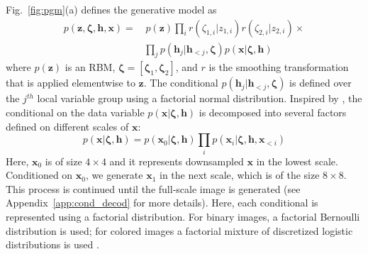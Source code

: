 \documentclass{article}
\newcommand{\x}{{\pmb{x}}}
\newcommand{\z}{{\pmb{z}}}
\newcommand{\h}{{\pmb{h}}}
\newcommand{\bzeta}{{\pmb{\zeta}}}
\begin{document}
Fig.~\ref{fig:pgm}(a) defines the generative model as
\begin{align*}
 p(\z, \bzeta, \h, \x) =& \, p(\z) \prod_i r(\zeta_{1,i}|z_{1,i}) r(\zeta_{2,i}|z_{2,i}) \times \\ & \prod_j p(\h_j | \h_{<j}, \bzeta)p(\x|\bzeta, \h)
\end{align*}
where $p(\z)$ is an RBM, $\bzeta = [\bzeta_1,\bzeta_2]$, and $r$ is the smoothing transformation that is applied 
elementwise to $\z$.
The conditional $p(\h_j | \h_{<j}, \bzeta)$ is defined over the $j^{th}$ local variable
group using a factorial normal distribution. Inspired by \cite{reedParallel2017, denton2015deep}, the conditional on the data variable
$p(\x|\bzeta, \h)$ is decomposed into several factors defined on different scales of $\x$:
\begin{equation*}
 p(\x|\bzeta, \h) = p(\x_0|\bzeta, \h) \prod_{i} p(\x_i|\bzeta, \h, \x_{<i})
\end{equation*}
Here, $\x_0$ is of size $4\times4$ and it represents downsampled $\x$ in the lowest scale. 
Conditioned on $\x_0$, we generate $\x_1$ in the next scale, which is of the size $8\times8$.
This process is continued until the full-scale image is generated (see Appendix~\ref{app:cond_decod} for more details). Here,
each conditional is represented using a factorial distribution. For binary images, a
factorial Bernoulli distribution is used; for colored images a factorial mixture of
discretized logistic distributions is used \cite{salimans2017pixelcnn++}.
\end{document}
